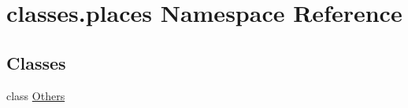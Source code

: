 \hypertarget{namespaceclasses_1_1places}{}\section{classes.\+places Namespace Reference}
\label{namespaceclasses_1_1places}
\subsection*{Classes}
\begin{DoxyCompactItemize}
\item 
class \hyperlink{classclasses_1_1places_1_1Others}{Others}
\end{DoxyCompactItemize}
